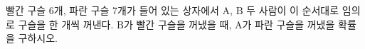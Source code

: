 빨간 구슬 6개, 파란 구슬 7개가 들어 있는 상자에서 $\mathrm{A}$, $\mathrm{B}$ 두 사람이 이 순서대로 임의로 구슬을 한 개씩 꺼낸다. $\mathrm{B}$가 빨간 구슬을 꺼냈을 때, $\mathrm{A}$가 파란 구슬을 꺼냈을 확률을 구하시오. 

